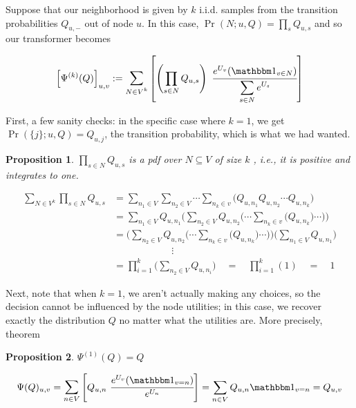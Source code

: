\documentclass{article}
\newtheorem{prop}{Proposition}
\theoremstyle{definition}
\begin{document}
	Suppose that our neighborhood is given by $k$ i.i.d. samples from the transition probabilities $Q_{u,-}$ out of node $u$. In this case, $\Pr(N;u,Q) = \prod_{s} Q_{u,s}$ and so our transformer becomes
	
	\begin{equation}
		\Big[\Psi^{(k)}(Q)\Big]_{u,v} := \mathlarger{\sum}_{N \in V^{k}} \left[\left(\prod_{s \in N}Q_{u,s}\right) ~\cfrac{ e^{U_v}  (\mathbbm 1_{v \in N})}{ \displaystyle \sum\limits_{ s \in N } e^{U_s} } \right]
	\end{equation}
	
	First, a few sanity checks: in the specific case where $k = 1$, we get $\Pr(\{j\}; u, Q) = Q_{u,j}$, the transition probability, which is what we had wanted.\\
	
	\begin{prop}
		$\prod_{s \in N}Q_{u,s}$ is a pdf over $N \subseteq V$ of size $k$ , i.e., it is positive and integrates to one.
	\end{prop}
	\begin{prf}
		\begin{align*}
			\sum_{N \in V^{k}}\prod_{s \in N}Q_{u,s} &= 
				\sum_{n_1 \in V} \sum_{n_2 \in V}\cdots \sum_{n_k \in v} \Big(Q_{u,n_1}Q_{u,n_2} \cdots Q_{u,n_k}\Big) \\
				&= \sum_{n_1 \in V} Q_{u,n_1} \Big(\sum_{n_2 \in V}Q_{u,n_2} \Big( \cdots \sum_{n_k \in v} \Big(Q_{u,n_k}\Big)\cdots\Big)\Big) \\
				&= \Big(\sum_{n_2 \in V}Q_{u,n_2} \Big( \cdots \sum_{n_k \in v} \Big(Q_{u,n_k}\Big)\cdots\Big)\Big) \Big(\sum_{n_1 \in V} Q_{u,n_1} \Big)\\
				&\hspace{1in}\vdots\\
				&= \prod_{i=1}^k \Big( \sum_{n_2 \in V}Q_{u,n_i} \Big) \quad
				=\quad \prod_{i=1}^k (1) \quad=\quad 1
		\end{align*}
	\end{prf}

	Next, note that when $k=1$, we aren't actually making any choices, so the decision cannot be influenced by the node utilities; in this case, we recover exactly the distribution $Q$ no matter what the utilities are. More precisely,\\
	theorem
	\begin{prop}
		$\Psi^{(1)}(Q) = Q$
	\end{prop}
	\begin{prf}
		\[ \Psi(Q)_{u,v} = \mathlarger{\sum}_{n \in V} \left[Q_{u,n} ~\cfrac{ e^{U_v}  (\mathbbm 1_{v = n})}{ e^{U_n} }\right] = \sum_{n \in V} Q_{u,n} \mathbbm 1_{v=n} = Q_{u,v} 
		 \]
	\end{prf}
\end{document}
